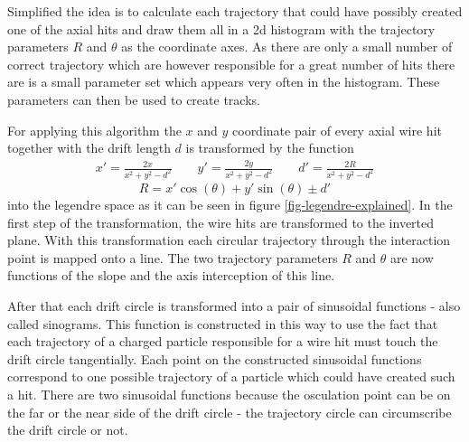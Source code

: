 Simplified the idea is to calculate each trajectory that could have possibly created one of the axial hits and draw them all in a 2d histogram with the trajectory parameters $R$ and $\theta$ as the coordinate axes. As there are only a small number of correct trajectory which are however responsible for a great number of hits there are is a small parameter set which appears very often in the histogram. These parameters can then be used to create tracks.

For applying this algorithm the $x$ and $y$ coordinate pair of every axial wire hit together with the drift length $d$ is transformed by the function
\begin{align*} x' = \frac{2x}{x^2 + y^2 - d^2} \qquad y' = \frac{2y}{x^2 + y^2 - d^2}  \qquad d' = \frac{2R}{x^2 + y^2 - d^2} \end{align*}
$$R = x' \cos(\theta) + y' \sin(\theta) \pm d'$$
into the legendre space as it can be seen in figure \ref{fig-legendre-explained}. In the first step of the transformation, the wire hits are transformed to the inverted plane. With this transformation each circular trajectory through the interaction point is mapped onto a line. The two trajectory parameters $R$ and $\theta$ are now functions of the slope and the axis interception of this line. 

After that each drift circle is transformed into a pair of sinusoidal functions - also called sinograms. This function is constructed in this way to use the fact that each trajectory of a charged particle responsible for a wire hit must touch the drift circle tangentially. Each point on the constructed sinusoidal functions correspond to one possible trajectory of a particle which could have created such a hit. There are two sinusoidal functions because the osculation point can be on the far or the near side of the drift circle - the trajectory circle can circumscribe the drift circle or not.


